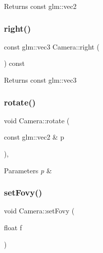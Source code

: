 \begin{DoxyReturn}{Returns}
const glm\+::vec2 
\end{DoxyReturn}
\mbox{\label{class_camera_a0f9545b5f7787ddc62f2d3a0f1e3c6d6}} 
\subsubsection{\texorpdfstring{right()}{right()}}
{\footnotesize\ttfamily const glm\+::vec3 Camera\+::right (\begin{DoxyParamCaption}{ }\end{DoxyParamCaption}) const\hspace{0.3cm}{\ttfamily [inline]}}

\begin{DoxyReturn}{Returns}
const glm\+::vec3 
\end{DoxyReturn}
\mbox{\label{class_camera_a46f849a8ee9514d0e35269f5fce48096}} 
\subsubsection{\texorpdfstring{rotate()}{rotate()}}
{\footnotesize\ttfamily void Camera\+::rotate (\begin{DoxyParamCaption}\item[{const glm\+::vec2 \&}]{p }\end{DoxyParamCaption})\hspace{0.3cm}{\ttfamily [inline]}, {\ttfamily [protected]}}


\begin{DoxyParams}{Parameters}
{\em p} & \\
\hline
\end{DoxyParams}
\mbox{\label{class_camera_ac21d2ee509fb8df94333a839b0892d54}} 
\subsubsection{\texorpdfstring{set\+Fovy()}{setFovy()}}
{\footnotesize\ttfamily void Camera\+::set\+Fovy (\begin{DoxyParamCaption}\item[{float}]{f }\end{DoxyParamCaption})}


